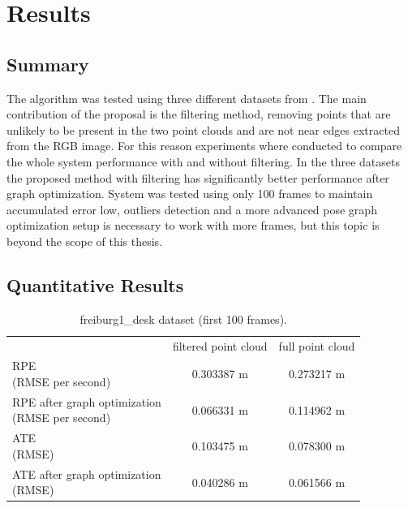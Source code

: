 \section{Results}
\subsection{Summary}

     The algorithm was tested using three different datasets from \cite{sturm12iros}. The main contribution of the 
proposal is the filtering method, removing points that are unlikely to be present in the two point clouds and are not 
near edges extracted from the RGB image. For this reason experiments where conducted to compare the whole system performance 
with and without filtering. In the three datasets the proposed method with filtering has significantly better performance after 
graph optimization. System was tested using only 100 frames to maintain accumulated error low, outliers detection and a more advanced  
pose graph optimization setup is necessary to work with more frames, but this topic is beyond the scope of this thesis.

\subsection{Quantitative Results}
\begin{center}
\begin{table}[H]
\begin{tabular}{ |l|c|c|}
\hline & filtered point cloud & full point cloud \\
\pbox{20cm}{RPE \\ (RMSE per second)} & 0.303387 m & 0.273217 m \\
\hline
\pbox{20cm} {RPE after graph optimization \\ (RMSE per second)} &  0.066331 m &  0.114962 m\\
\hline
\pbox{20cm}{ATE \\ (RMSE)} & 0.103475 m & 0.078300 m\\
\hline
\pbox{20cm} {ATE after graph optimization \\ (RMSE)} & 0.040286 m & 0.061566 m\\
\hline
\end{tabular}
\caption{freiburg1\_desk dataset (first 100 frames).}
\label{table:quantfd1}
\end{table}
\end{center}


